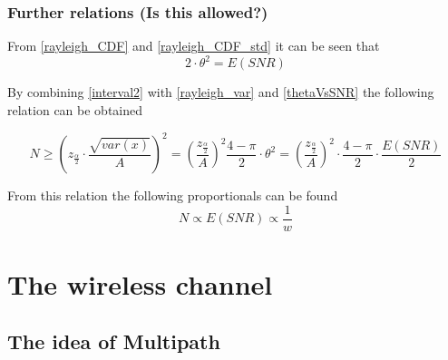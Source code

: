 \subsection{Further relations (Is this allowed?)}


From \autoref{rayleigh_CDF} and \autoref{rayleigh_CDF_std} it can be seen that
\begin{equation}\label{thetaVsSNR}
2\cdot\theta^2 = E\left(SNR\right)
\end{equation}

By combining \autoref{interval2} with \autoref{rayleigh_var} and \autoref{thetaVsSNR} the following relation can be obtained

\begin{equation}
N \geq \left(z_{\frac{\alpha}{2}} \cdot \frac{\sqrt{var(x)}}{A} \right)^2 = \left(\frac{z_{\frac{\alpha}{2}}}{A}\right)^2 \frac{4-\pi}{2}\cdot \theta^2 = \left(\frac{z_{\frac{\alpha}{2}}}{A}\right)^2 \cdot \frac{4-\pi}{2}\cdot \frac{E\left(SNR\right)}{2}
\end{equation}

From this relation the following proportionals can be found
\begin{equation}
N \propto E\left(SNR\right)\propto \frac{1}{w}
\end{equation}
\chapter{The wireless channel}




\section{The idea of Multipath}


